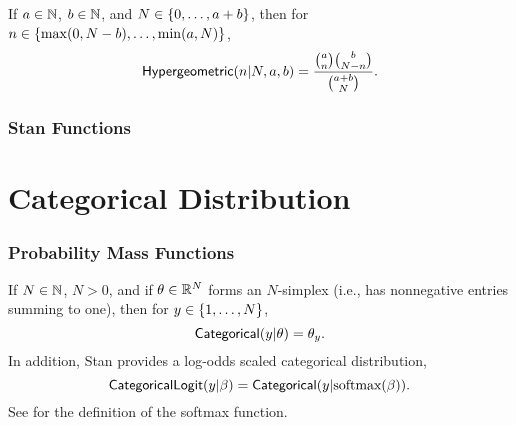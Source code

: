 If $a \in \mathbb{N}$, $b \in \mathbb{N}$, and $N \in \{ 0,\ldots,a+b \}$,
then for $n \in \{ \max(0,N-b),\ldots,\min(a,N) \}$,
\[
\mbox{\sf Hypergeometric}(n|N,a,b)
=
\frac{\normalsize{\binom{a}{n} \binom{b}{N - n}}}
     {\normalsize{\binom{a + b}{N}}}.
\]



\subsubsection{Stan Functions}

\begin{description}
%

%
\end{description}
%
\begin{description}
\end{description}




\section{Categorical Distribution}\label{categorical-distribution.section}

\subsubsection{Probability Mass Functions}

If $N \in \mathbb{N}$, $N > 0$, and if $\theta \in \mathbb{R}^N$ forms an
$N$-simplex (i.e., has nonnegative entries summing to one), then for
$y \in \{ 1,\ldots,N \}$,
%
\[
\mbox{\sf Categorical}(y|\theta) = \theta_y.
\]
%
In addition, Stan provides a log-odds scaled categorical distribution,
%
\[
\mbox{\sf CategoricalLogit}(y|\beta)
= \mbox{\sf Categorical}(y|\mbox{softmax}(\beta)).
\]
%
See  for the definition of the softmax function.




